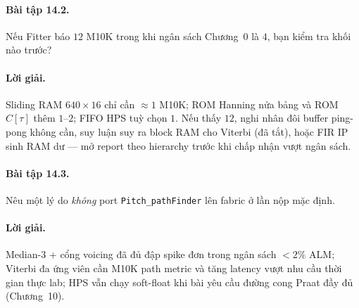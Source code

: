 \paragraph{Bài tập 14.2.} Nếu Fitter báo $12$ M10K trong khi ngân sách Chương~0 là $4$, bạn kiểm tra khối nào trước?

\paragraph{Lời giải.} Sliding RAM $640\times 16$ chỉ cần $\approx 1$ M10K; ROM Hanning nửa bảng và ROM $C[\tau]$ thêm $1$--$2$; FIFO HPS tuỳ chọn $1$. Nếu thấy $12$, nghi nhân đôi buffer ping-pong không cần, suy luận suy ra block RAM cho Viterbi (đã tắt), hoặc FIR IP sinh RAM dư --- mở report theo hierarchy trước khi chấp nhận vượt ngân sách.

\paragraph{Bài tập 14.3.} Nêu một lý do \emph{không} port \texttt{Pitch\_pathFinder} lên fabric ở lần nộp mặc định.

\paragraph{Lời giải.} Median-3 + cổng voicing đã đủ đập spike đơn trong ngân sách $<2\%$ ALM; Viterbi đa ứng viên cần M10K path metric và tăng latency vượt nhu cầu thời gian thực lab; HPS vẫn chạy soft-float khi bài yêu cầu đường cong Praat đầy đủ (Chương~10).
